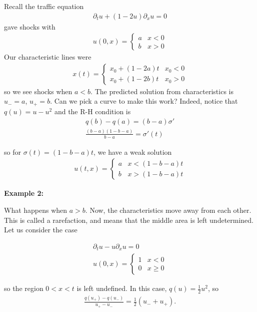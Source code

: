 \documentclass{article}
\newcommand{\pd}{\partial}
\begin{document}
	\vspace{0.25 cm}
	
	Recall the traffic equation 
	\begin{align*}
		\pd_{t} u + (1-2u) \pd_{x}u = 0
	\end{align*}
	gave shocks with 
	\begin{align*}
		u(0,x) = \begin{cases}
			a & x<0 \\
			b & x>0
		\end{cases}
	\end{align*}
	Our characteristic lines were 
	\begin{align*}
		x(t) = \begin{cases}
			x_0 + (1-2a)t & x_0 < 0 \\
			x_0 + (1-2b)t & x_0 > 0
		\end{cases}
	\end{align*}
	so we see shocks when $a<b$. The predicted solution from characteristics is $u_- = a$, $u_+ = b$. Can we pick a curve to make this work? Indeed, notice that $q(u) = u - u^2$ and the R-H condition is 
	\begin{align*}
		q(b)-q(a) = (b-a) \sigma' \\
		\frac{(b-a)(1-b-a)}{b-a} = \sigma'(t)
	\end{align*}
	
	so for $\sigma(t) = (1-b-a)t$, we have a weak solution 
	\begin{align*}
		u(t,x) = \begin{cases}
			a & x < (1-b-a)t \\ b & x>(1-b-a)t
		\end{cases}
	\end{align*}
	
	\textbf{Example 2:}
	
	What happens when $a>b$. Now, the characteristics move away from each other. This is called a rarefaction, and means that the middle area is left undetermined. Let us consider the case 
	
	\begin{align*}
		\pd_{t}u - u \pd_{x}u = 0 \\
		u(0,x) = \begin{cases}
			1 & x < 0 \\
			0 & x \geq 0
		\end{cases}
	\end{align*}
	
	so the region $ 0 < x < t$ is left undefined. In this case, $q(u) = \frac{1}{2} u^{2}$, so 
	\begin{align*}
		\frac{q(u_+)-q(u_-)}{u_+ - u_-} = \frac{1}{2}(u_- + u_+). 
	\end{align*}
	
\end{document}
